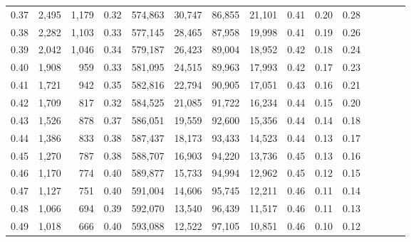 \begin{tabular}{rrrcrrrrrrrrrrr}
0.37 &   2,495 &  1,179 &                                       0.32 &  574,863 &   30,747 &   86,855 &   21,101 &  0.41 &  0.20 &                         0.28 \\
0.38 &   2,282 &  1,103 &                                       0.33 &  577,145 &   28,465 &   87,958 &   19,998 &  0.41 &  0.19 &                         0.26 \\
0.39 &   2,042 &  1,046 &                                       0.34 &  579,187 &   26,423 &   89,004 &   18,952 &  0.42 &  0.18 &                         0.24 \\
0.40 &   1,908 &    959 &                                       0.33 &  581,095 &   24,515 &   89,963 &   17,993 &  0.42 &  0.17 &                         0.23 \\
0.41 &   1,721 &    942 &                                       0.35 &  582,816 &   22,794 &   90,905 &   17,051 &  0.43 &  0.16 &                         0.21 \\
0.42 &   1,709 &    817 &                                       0.32 &  584,525 &   21,085 &   91,722 &   16,234 &  0.44 &  0.15 &                         0.20 \\
0.43 &   1,526 &    878 &                                       0.37 &  586,051 &   19,559 &   92,600 &   15,356 &  0.44 &  0.14 &                         0.18 \\
0.44 &   1,386 &    833 &                                       0.38 &  587,437 &   18,173 &   93,433 &   14,523 &  0.44 &  0.13 &                         0.17 \\
0.45 &   1,270 &    787 &                                       0.38 &  588,707 &   16,903 &   94,220 &   13,736 &  0.45 &  0.13 &                         0.16 \\
0.46 &   1,170 &    774 &                                       0.40 &  589,877 &   15,733 &   94,994 &   12,962 &  0.45 &  0.12 &                         0.15 \\
0.47 &   1,127 &    751 &                                       0.40 &  591,004 &   14,606 &   95,745 &   12,211 &  0.46 &  0.11 &                         0.14 \\
0.48 &   1,066 &    694 &                                       0.39 &  592,070 &   13,540 &   96,439 &   11,517 &  0.46 &  0.11 &                         0.13 \\
0.49 &   1,018 &    666 &                                       0.40 &  593,088 &   12,522 &   97,105 &   10,851 &  0.46 &  0.10 &                         0.12 \\

\end{tabular}
